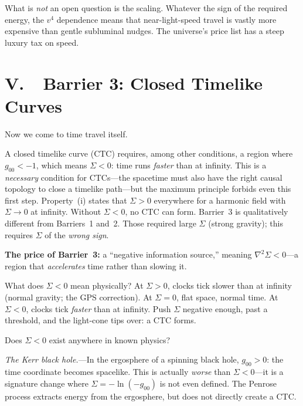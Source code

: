 \documentclass[12pt]{article}
\begin{document}
What is \emph{not} an open question is the scaling. Whatever the sign
of the required energy, the $v^4$ dependence means that near-light-speed
travel is vastly more expensive than gentle subluminal nudges. The
universe's price list has a steep luxury tax on speed.


\section*{V.\ \ Barrier 3: Closed Timelike Curves}

Now we come to time travel itself.

A closed timelike curve (CTC) requires, among other conditions, a
region where $g_{00} < -1$, which means $\Sigma < 0$: time runs
\emph{faster} than at infinity. This is a \emph{necessary} condition
for CTCs---the spacetime must also have the right causal topology to
close a timelike path---but the maximum principle forbids even this
first step. Property~(i) states that $\Sigma > 0$ everywhere for a
harmonic field with $\Sigma \to 0$ at infinity. Without $\Sigma < 0$,
no CTC can form. Barrier~3 is qualitatively different from Barriers~1
and~2. Those required large $\Sigma$ (strong gravity); this requires
$\Sigma$ of the \emph{wrong sign}.




\noindent\textbf{The price of Barrier~3:} a ``negative information
source,'' meaning $\nabla^2\Sigma < 0$---a region that \emph{accelerates}
time rather than slowing it.



What does $\Sigma < 0$ mean physically? At $\Sigma > 0$, clocks tick
slower than at infinity (normal gravity; the GPS correction). At
$\Sigma = 0$, flat space, normal time. At $\Sigma < 0$, clocks tick
\emph{faster} than at infinity. Push $\Sigma$ negative enough, past a
threshold, and the light-cone tips over: a CTC forms.

Does $\Sigma < 0$ exist anywhere in known physics?

\emph{The Kerr black hole.}---In the ergosphere of a spinning black
hole, $g_{00} > 0$: the time coordinate becomes spacelike. This is
actually \emph{worse} than $\Sigma < 0$---it is a signature change where
$\Sigma = -\ln(-g_{00})$ is not even defined. The Penrose process
extracts energy from the ergosphere, but does not directly create a CTC.
\end{document}
